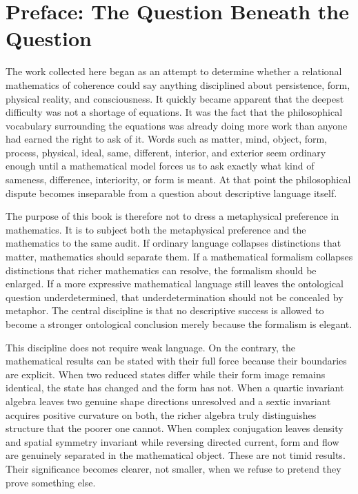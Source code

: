 \chapter{Preface: The Question Beneath the Question}

The work collected here began as an attempt to determine whether a relational mathematics of coherence could say anything disciplined about persistence, form, physical reality, and consciousness. It quickly became apparent that the deepest difficulty was not a shortage of equations. It was the fact that the philosophical vocabulary surrounding the equations was already doing more work than anyone had earned the right to ask of it. Words such as matter, mind, object, form, process, physical, ideal, same, different, interior, and exterior seem ordinary enough until a mathematical model forces us to ask exactly what kind of sameness, difference, interiority, or form is meant. At that point the philosophical dispute becomes inseparable from a question about descriptive language itself.

The purpose of this book is therefore not to dress a metaphysical preference in mathematics. It is to subject both the metaphysical preference and the mathematics to the same audit. If ordinary language collapses distinctions that matter, mathematics should separate them. If a mathematical formalism collapses distinctions that richer mathematics can resolve, the formalism should be enlarged. If a more expressive mathematical language still leaves the ontological question underdetermined, that underdetermination should not be concealed by metaphor. The central discipline is that no descriptive success is allowed to become a stronger ontological conclusion merely because the formalism is elegant.

This discipline does not require weak language. On the contrary, the mathematical results can be stated with their full force because their boundaries are explicit. When two reduced states differ while their form image remains identical, the state has changed and the form has not. When a quartic invariant algebra leaves two genuine shape directions unresolved and a sextic invariant acquires positive curvature on both, the richer algebra truly distinguishes structure that the poorer one cannot. When complex conjugation leaves density and spatial symmetry invariant while reversing directed current, form and flow are genuinely separated in the mathematical object. These are not timid results. Their significance becomes clearer, not smaller, when we refuse to pretend they prove something else.

